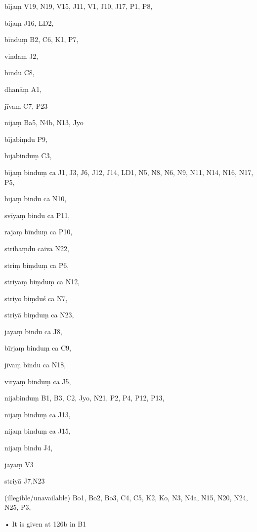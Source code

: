 \begin{marma}[hp03_090]


\item[bījaṃ] V19, N19, V15, J11, V1, J10, J17, P1, P8, 
\item[bijaṃ] J16, LD2,
\item[bīnduṃ] B2, C6, K1, P7,
\item[vindaṃ] J2,
\item[bīndu] C8,
\item[dhanāṃ] A1, 
\item[jīvaṃ] C7, P23
\item[nijaṃ] Ba5, N4b, N13, Jyo
\item[bījabiṃdu] P9,
\item[bījabinduṃ] C3,
\item[bījaṃ binduṃ ca] J1, J3, J6, J12, J14, LD1, N5, N8, N6, N9, N11, N14, N16, N17, P5, 
\item[bījaṃ bindu ca] N10,
\item[svīyaṃ bindu ca] P11,
\item[rajaṃ bīnduṃ ca] P10,
\item[stribaṃdu caiva] N22,
\item[striṃ biṃduṃ ca] P6,
\item[striyaṃ biṃduṃ ca] N12,
\item[striyo biṃduś ca] N7,
\item[striyā biṃduṃ ca] N23,
\item[jayaṃ bindu ca] J8,
\item[bīrjaṃ binduṃ ca] C9,
\item[jīvaṃ bindu ca] N18,
\item[vīryaṃ binduṃ ca] J5,
\item[nijabinduṃ] B1, B3, C2, Jyo, N21, P2, P4, P12, P13, 
\item[nījaṃ binduṃ ca] J13,
\item[nijaṃ binduṃ ca] J15,
\item[nijaṃ bindu] J4,
\item[jayaṃ] V3
\item[striyā] J7,N23
\item[(illegible/unavailable)] Bo1, Bo2, Bo3, C4, C5, K2, Ko, N3, N4a, N15, N20, N24, N25, P3,

  \begin{description}
    • It is given at 126b in B1 
  \end{description}

\end{marma}

